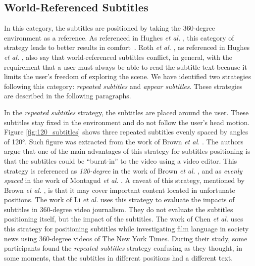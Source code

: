 \subsection{World-Referenced Subtitles}
\label{subsec:world_referenced}

In this category, the subtitles are positioned by taking the 360-degree environment as a reference. 
As referenced in Hughes \emph{et al.} \cite{hughes_disruptive_2019}, this category of strategy leads to better results in comfort~\cite{rothe2018positioning}. Roth \emph{et al.} \cite{rothe2018positioning}, as referenced in Hughes \emph{et al.} \cite{hughes_disruptive_2019}, also say that world-referenced subtitles conflict, in general, with the requirement that a user must always be able to read the subtitle text because it limits the user's freedom of exploring the scene.
We have identified two strategies following this category: \emph{repeated subtitles} and \emph{appear subtitles}. These strategies are described in the following paragraphs. 

In the \emph{repeated subtitles} strategy, the subtitles are placed around the user. These subtitles stay fixed in the environment and do not follow the user's head motion. Figure \ref{fig:120_subtitles} shows three repeated subtitles evenly spaced by angles of 120°. Such figure was extracted from the work of Brown \emph{et al.} \cite{brown_subtitles_2017}. The authors argue that one of the main advantages of this strategy for subtitles positioning is that the subtitles could be ``burnt-in'' to the video using a video editor. This strategy is referenced as \emph{120-degree} in the work of Brown \emph{et al.} \cite{brown_subtitles_2017}, and as \emph{evenly spaced} in the work of Montagud \emph{et al.} \cite{montagud_culture_2020}. A caveat of this strategy, mentioned by Brown \emph{et al.} \cite{brown_subtitles_2017}, is that it may cover important content located in unfortunate positions. 
The work of Li \emph{et al.} \cite{li_impacts_2018} uses this strategy to evaluate the impacts of subtitles in 360-degree video journalism. They do not evaluate the subtitles positioning itself, but the impact of the subtitles. The work of Chen \emph{et al.} \cite{chen_film_2017} uses this strategy for positioning subtitles while investigating film language in society news using 360-degree videos of The New York Times. During their study, some participants found the \emph{repeated subtitles} strategy confusing as they thought, in some moments, that the subtitles in different positions had a different text.

